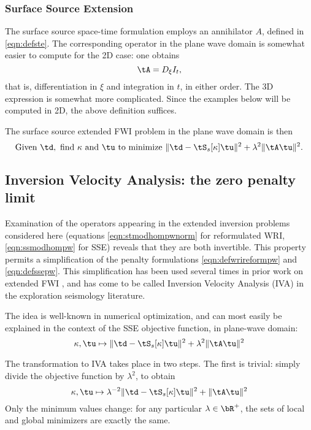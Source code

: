 \subsubsection{Surface Source Extension}

The surface source space-time formulation employs an
annihilator $A$, defined in \ref{eqn:defste}. The corresponding
operator in the plane wave domain is somewhat easier to compute for the 2D
case: one obtains 
\[
\tA = D_{\xi}I_t,
\]
that is, differentiation in $\xi$ and integration in $t$, in either
order. The 3D expression is somewhat more complicated. Since the
examples below will be computed in 2D, the above definition suffices.

The surface source extended FWI problem in the plane wave domain is then
\begin{equation}
  \label{eqn:defssepw}
  \mbox{Given } \td, \mbox{ find }\kappa \mbox{ and }\tu \mbox{ to
    minimize }
  \| \td -  \tS_s[\kappa]\tu\|^2+\lambda^2\|\tA\tu\|^2.
\end{equation}

\subsection{Inversion Velocity Analysis: the zero penalty limit}
Examination of the operators appearing in the extended inversion
problems considered here (equations \ref{eqn:stmodhompwnorm} for
reformulated WRI, \ref{eqn:ssmodhompw} for SSE) reveals that they
are both invertible. This property permits a simplification of the
penalty formulations \ref{eqn:defwrireformpw} and
\ref{eqn:defssepw}. This simplification has been used several times in
prior work on extended FWI
\cite[]{Symes:EAGE15,Herve2017,HouSymes:Geo18}, and has come to be
called Inversion Velocity Analysis (IVA) in the exploration seismology
literature.

The idea is well-known in numerical optimization, and can most easily
be explained in the context of the SSE objective function, in
plane-wave domain:
\begin{equation}
  \label{eqn:ssepen}
  \kappa,\tu \mapsto \|\td-\tS_s[\kappa]\tu\|^2 + \lambda^2\|\tA\tu\|^2
\end{equation}

The transformation to IVA takes place in two steps. The first is
trivial: simply divide the objective function by $\lambda^2$, to
obtain
\begin{equation}
  \label{eqn:ssepeninv}
  \kappa,\tu \mapsto \lambda^{-2}\|\td-\tS_s[\kappa]\tu\|^2 + \|\tA\tu\|^2
\end{equation}
Only the minimum values change: for any particular $\lambda \in
\bR^+$, the sets of local and global minimizers are exactly the same.

